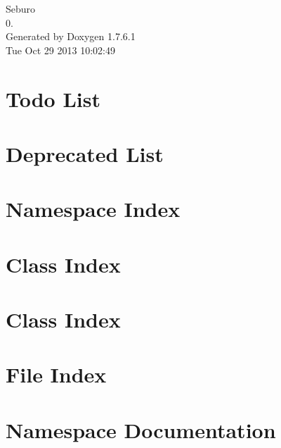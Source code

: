 \documentclass[a4paper]{book}
\begin{document}
\hypersetup{pageanchor=false,citecolor=blue}
\begin{titlepage}
\vspace*{7cm}
\begin{center}
{\Large \-Seburo \\[1ex]\large 0. }\\
\vspace*{1cm}
{\large \-Generated by Doxygen 1.7.6.1}\\
\vspace*{0.5cm}
{\small Tue Oct 29 2013 10:02:49}\\
\end{center}
\end{titlepage}
\clearemptydoublepage
{}
\tableofcontents
\clearemptydoublepage
{}
\hypersetup{pageanchor=true,citecolor=blue}
\chapter{\-Todo \-List}
\label{todo}
\hypertarget{todo}{}

\chapter{\-Deprecated \-List}
\label{deprecated}
\hypertarget{deprecated}{}

\chapter{\-Namespace \-Index}

\chapter{\-Class \-Index}

\chapter{\-Class \-Index}

\chapter{\-File \-Index}

\chapter{\-Namespace \-Documentation}

\end{document}
